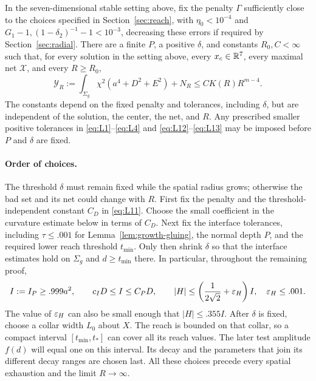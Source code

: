 \begin{proposition}\label{prop:growth-fourth-order}
In the seven-dimensional stable setting above, fix the penalty $\Gamma$ sufficiently close to the choices specified in
Section~\ref{sec:reach}, with $\eta_0<10^{-4}$ and
$G_1-1,(1-\delta_2)^{-1}-1<10^{-3}$, decreasing these errors if required
by Section~\ref{sec:radial}.  There are a finite $P$, a positive
$\delta$, and constants $R_0,C<\infty$ such that, for every solution in
the setting above, every $x_c\in\mathbb R^7$, every maximal net
$\mathcal X$, and every $R\ge R_0$,
\begin{equation}\label{eq:M1}
 \mathcal Y_R:=
 \int_{\Sigma_g}\chi^2(a^4+D^2+E^2)+N_R
 \le C K(R)R^{m-4}.
\end{equation}
The constants depend on the fixed penalty and tolerances, including
$\delta$, but are independent of the solution, the center, the net,
and $R$.  Any prescribed smaller positive tolerances in
\eqref{eq:L1}--\eqref{eq:L4} and \eqref{eq:L12}--\eqref{eq:L13}
may be imposed before $P$ and $\delta$ are fixed.
\end{proposition}

\paragraph{Order of choices.}
The threshold $\delta$ must remain fixed while the spatial radius grows;
otherwise the bad set and its net could change with $R$.  First fix the penalty
and the threshold-independent constant $C_D$ in \eqref{eq:L11}.
Choose the small coefficient in the curvature estimate below in terms
of $C_D$.  Next fix the interface tolerances, including
$\tau\le .001$ for Lemma~\ref{lem:growth-gluing}, the normal depth $P$,
and the required lower reach threshold $t_{\min}$.  Only then shrink
$\delta$ so that the interface estimates hold on $\Sigma_g$ and
$d\ge t_{\min}$ there.  In particular, throughout the remaining proof,
\begin{equation}\label{eq:growth-sharp-budget}
 I:=I_P\ge .999a^2,\qquad c_I D\le I\le C_P D,
 \qquad |H|\le\left(\frac1{2\sqrt2}+\varepsilon_H\right)I,
 \quad \varepsilon_H\le .001.
\end{equation}
The value of $\varepsilon_H$ can also be small enough that $|H|\le .355I$.
After $\delta$ is fixed, choose a collar width $L_0$ about $X$.
The reach is bounded on that collar, so a compact interval
$[t_{\min},t_*]$ can cover all its reach values.  The later test amplitude
$f(d)$ will equal one on this interval.  Its decay and the parameters
that join its different decay ranges are chosen last.  All these choices
precede every spatial exhaustion and the limit $R\to\infty$.

